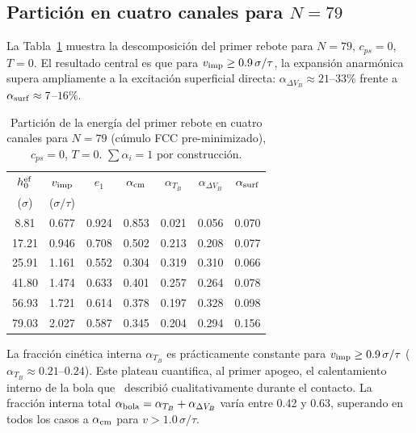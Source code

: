 \documentclass[aps,pre,twocolumn,reprint,superscriptaddress]{revtex4-2}
\begin{document}
\subsection{Partición en cuatro canales para \texorpdfstring{$N=79$}{N=79}}
\label{sec:4canales}

La Tabla~\ref{tab:particion4} muestra la descomposición del primer rebote para
$N=79$, $c_{ps}=0$, $T=0$. El resultado central es que para
$v_{\rm imp}\geq0.9\,\sigma/\tau$, la expansión anarmónica supera ampliamente
a la excitación superficial directa: $\alpha_{\Delta V_B}\approx21$--$33\%$
frente a $\alpha_{\rm surf}\approx7$--$16\%$.

\begin{table}[tp]
\centering
\small
\caption{Partición de la energía del primer rebote en cuatro canales para
$N=79$ (cúmulo FCC pre-minimizado), $c_{ps}=0$, $T=0$.
$\sum\alpha_i=1$ por construcción.}
\label{tab:particion4}
\begin{tabular}{ccccccc}
\toprule
$h_0^{\rm ef}$ & $v_{\rm imp}$ & $e_1$ &
$\alpha_{\rm cm}$ & $\alpha_{T_B}$ & $\alpha_{\Delta V_B}$ &
$\alpha_{\rm surf}$ \\
($\sigma$) & ($\sigma/\tau$) & & & & & \\
\midrule
 8.81 & 0.677 & 0.924 & 0.853 & 0.021 & 0.056 & 0.070 \\
17.21 & 0.946 & 0.708 & 0.502 & 0.213 & 0.208 & 0.077 \\
25.91 & 1.161 & 0.552 & 0.304 & 0.319 & 0.310 & 0.066 \\
41.80 & 1.474 & 0.633 & 0.401 & 0.257 & 0.264 & 0.078 \\
56.93 & 1.721 & 0.614 & 0.378 & 0.197 & 0.328 & 0.098 \\
79.03 & 2.027 & 0.587 & 0.345 & 0.204 & 0.294 & 0.156 \\
\bottomrule
\end{tabular}
\end{table}

La fracción cinética interna $\alpha_{T_B}$ es prácticamente constante para
$v_{\rm imp}\geq0.9\,\sigma/\tau$ ($\alpha_{T_B}\approx0.21$--$0.24$).
Este plateau cuantifica, al primer apogeo, el calentamiento interno de la
bola que~\cite{Gutierrez2012} describió cualitativamente durante el contacto.
La fracción interna total $\alpha_{\rm bola}=\alpha_{T_B}+\alpha_{\Delta V_B}$
varía entre 0.42 y 0.63, superando en todos los casos a $\alpha_{\rm cm}$
para $v>1.0\,\sigma/\tau$.
\end{document}
